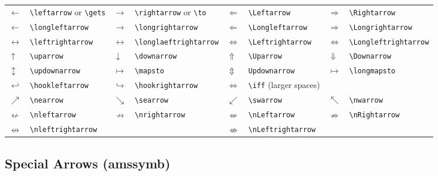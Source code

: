 \documentclass[10pt, english]{article}
\begin{document}
	\begin{center}
		\scriptsize
	\begin{tabular}{ll|ll|ll|ll}
		$\leftarrow$ & \verb|\leftarrow| or \verb|\gets| & $\rightarrow$ & \verb|\rightarrow| or \verb|\to| & $\Leftarrow$ & \verb|\Leftarrow| & $\Rightarrow$ & \verb|\Rightarrow| \\
		$\longleftarrow$ & \verb|\longleftarrow| & $\longrightarrow$ & \verb|\longrightarrow| & $\Longleftarrow$ & \verb|\Longleftarrow| & $\Longrightarrow$ & \verb|\Longrightarrow| \\
		$\leftrightarrow$ & \verb|\leftrightarrow| & $\longleftrightarrow$ & \verb|\longlaeftrightarrow| & $\Leftrightarrow$ & \verb|\Leftrightarrow| & $\Longleftrightarrow$ & \verb|\Longleftrightarrow| \\
		$\uparrow$ & \verb|\uparrow| & $\downarrow$ & \verb|\downarrow| & $\Uparrow$ & \verb|\Uparrow| & $\Downarrow$ & \verb|\Downarrow| \\
		$\updownarrow$ & \verb|\updownarrow| & $\mapsto$ & \verb|\mapsto| & $\Updownarrow$ & \verb|Updownarrow| & $\longmapsto$ & \verb|\longmapsto| \\
		$\hookleftarrow$ & \verb|\hookleftarrow| & $\hookrightarrow$ & \verb|\hookrightarrow| & $\iff$ & \verb|\iff| (larger spaces) \\ 
		$\nearrow$ & \verb|\nearrow| & $\searrow$ & \verb|\searrow| & $\swarrow$ & \verb|\swarrow| & $\nwarrow$ & \verb|\nwarrow| \\
		$\nleftarrow$ & \verb|\nleftarrow| & $\nrightarrow$ & \verb|\nrightarrow| & $\nLeftarrow$ & \verb|\nLeftarrow| & $\nRightarrow$ & \verb|\nRightarrow|\\
		$\nleftrightarrow$ & \verb|\nleftrightarrow| & & & $\nLeftrightarrow$ & \verb|\nLeftrightarrow|
	\end{tabular}
	\end{center}

	\subsection{Special Arrows (amssymb)}
\end{document}
